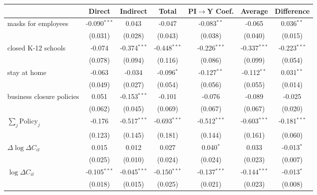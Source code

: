 
\begin{tabular}{lccccc|>{}c}
\toprule
  & Direct & Indirect & Total & PI$\to$Y Coef. & Average & Difference\\
\midrule
masks for employees & -0.090$^{***}$ & 0.043 & -0.047 & -0.083$^{**}$ & -0.065 & 0.036$^{**}$\\
 & (0.031) & (0.028) & (0.043) & (0.038) & (0.040) & (0.015)\\
closed K-12 schools & -0.074 & -0.374$^{***}$ & -0.448$^{***}$ & -0.226$^{***}$ & -0.337$^{***}$ & -0.223$^{***}$\\
 & (0.078) & (0.094) & (0.116) & (0.086) & (0.099) & (0.054)\\
stay at home & -0.063 & -0.034 & -0.096$^{*}$ & -0.127$^{**}$ & -0.112$^{**}$ & 0.031$^{**}$\\
 & (0.049) & (0.027) & (0.054) & (0.056) & (0.055) & (0.014)\\
business closure policies & 0.051 & -0.153$^{***}$ & -0.101 & -0.076 & -0.089 & -0.025\\
 & (0.062) & (0.045) & (0.069) & (0.067) & (0.067) & (0.020)\\
$\sum_j \mathrm{Policy}_j$ & -0.176 & -0.517$^{***}$ & -0.693$^{***}$ & -0.512$^{***}$ & -0.603$^{***}$ & -0.181$^{***}$\\
 & (0.123) & (0.145) & (0.181) & (0.144) & (0.161) & (0.060)\\
$\Delta \log \Delta C_{it}$ & 0.015 & 0.012 & 0.027 & 0.040$^{*}$ & 0.033 & -0.013$^{*}$\\
 & (0.025) & (0.010) & (0.024) & (0.024) & (0.023) & (0.007)\\
$\log \Delta C_{it}$ & -0.105$^{***}$ & -0.045$^{***}$ & -0.150$^{***}$ & -0.137$^{***}$ & -0.144$^{***}$ & -0.013$^{*}$\\
 & (0.018) & (0.015) & (0.025) & (0.021) & (0.023) & (0.008)\\
\bottomrule
\end{tabular}